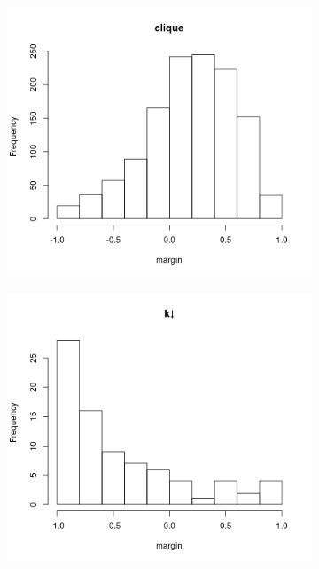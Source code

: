 \documentclass{l4proj}
\theoremstyle{definition}
\theoremstyle{remark}
\begin{document}
\begin{figure}
  \centering
  \begin{subfigure}[t]{0.49\textwidth}
    \centering
    \includegraphics[scale=0.5]{images/clique_hist.png}
  \end{subfigure}
  \begin{subfigure}[t]{0.49\textwidth}
    \centering
    \includegraphics[scale=0.5]{images/kdown_hist.png}
  \end{subfigure}
  \begin{subfigure}[t]{0.49\textwidth}
    \centering

\end{subfigure}
\end{figure}
\end{document}
